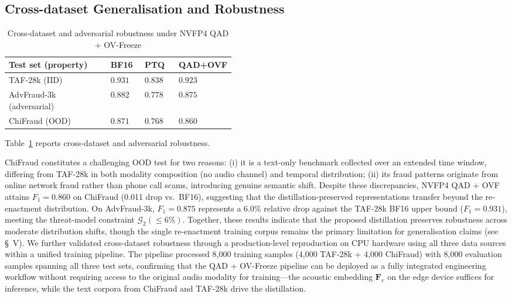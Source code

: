 \documentclass[final,5p,times,number]{elsarticle}
\begin{document}
\subsection{Cross-dataset Generalisation and Robustness}

\begin{table}[!t]
\centering
\caption{Cross-dataset and adversarial robustness under NVFP4 QAD + OV-Freeze}
\label{tab4-cross-en}
\small
\renewcommand{\arraystretch}{1.15}
\begin{tabular}{l>{\centering\arraybackslash}p{0.15\linewidth}>{\centering\arraybackslash}p{0.15\linewidth}>{\centering\arraybackslash}p{0.15\linewidth}}
\toprule
\textbf{Test set (property)} & \textbf{BF16} & \textbf{PTQ} & \textbf{QAD+OVF} \\
\midrule
TAF-28k (IID) & $0.931$ & $0.838$ & $\mathbf{0.923}$ \\
AdvFraud-3k (adversarial) & $0.882$ & $0.778$ & $\mathbf{0.875}$ \\
ChiFraud (OOD) & $0.871$ & $0.768$ & $\mathbf{0.860}$ \\
\bottomrule
\end{tabular}
\end{table}

Table~\ref{tab4-cross-en} reports cross-dataset and adversarial robustness.

ChiFraud constitutes a challenging OOD test for two reasons: (i) it is a text-only benchmark collected over an extended time window, differing from TAF-28k in both modality composition (no audio channel) and temporal distribution; (ii) its fraud patterns originate from online network fraud rather than phone call scams, introducing genuine semantic shift. Despite these discrepancies, NVFP4 QAD + OVF attains $F_1 = 0.860$ on ChiFraud (0.011 drop vs.\ BF16), suggesting that the distillation-preserved representations transfer beyond the re-enactment distribution. On AdvFraud-3k, $F_1 = 0.875$ represents a 6.0\% relative drop against the TAF-28k BF16 upper bound ($F_1=0.931$), meeting the threat-model constraint $\mathcal{G}_2(\le 6\%)$. Together, these results indicate that the proposed distillation preserves robustness across moderate distribution shifts, though the single re-enactment training corpus remains the primary limitation for generalisation claims (see \S~V). We further validated cross-dataset robustness through a production-level reproduction on CPU hardware using all three data sources within a unified training pipeline. The pipeline processed 8,000 training samples (4,000 TAF-28k + 4,000 ChiFraud) with 8,000 evaluation samples spanning all three test sets, confirming that the QAD + OV-Freeze pipeline can be deployed as a fully integrated engineering workflow without requiring access to the original audio modality for training---the acoustic embedding $\bm{F}_v$ on the edge device suffices for inference, while the text corpora from ChiFraud and TAF-28k drive the distillation.
\end{document}

